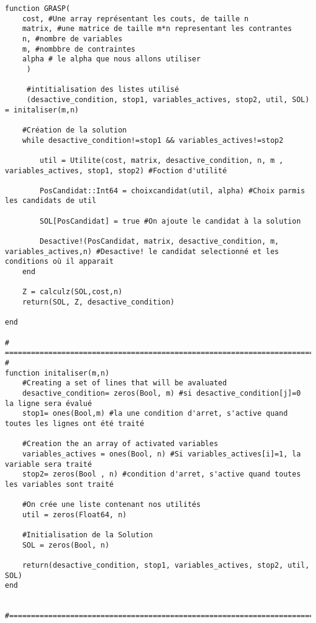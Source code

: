 \documentclass[10pt]{article}
\begin{document}
\lstset{language=julia}

{
\begin{lstlisting}
function GRASP(
    cost, #Une array représentant les couts, de taille n
    matrix, #une matrice de taille m*n representant les contrantes
    n, #nombre de variables
    m, #nombbre de contraintes
    alpha # le alpha que nous allons utiliser
     )

     #intitialisation des listes utilisé
     (desactive_condition, stop1, variables_actives, stop2, util, SOL) = initaliser(m,n)

    #Création de la solution
    while desactive_condition!=stop1 && variables_actives!=stop2

        util = Utilite(cost, matrix, desactive_condition, n, m , variables_actives, stop1, stop2) #Foction d'utilité

        PosCandidat::Int64 = choixcandidat(util, alpha) #Choix parmis les candidats de util

        SOL[PosCandidat] = true #On ajoute le candidat à la solution

        Desactive!(PosCandidat, matrix, desactive_condition, m, variables_actives,n) #Desactive! le candidat selectionné et les conditions où il apparait
    end

    Z = calculz(SOL,cost,n)
    return(SOL, Z, desactive_condition)

end

# =========================================================================== #
function initaliser(m,n)
    #Creating a set of lines that will be avaluated
    desactive_condition= zeros(Bool, m) #si desactive_condition[j]=0 la ligne sera évalué
    stop1= ones(Bool,m) #la une condition d'arret, s'active quand toutes les lignes ont été traité

    #Creation the an array of activated variables
    variables_actives = ones(Bool, n) #Si variables_actives[i]=1, la variable sera traité
    stop2= zeros(Bool , n) #condition d'arret, s'active quand toutes les variables sont traité

    #On crée une liste contenant nos utilités
    util = zeros(Float64, n)

    #Initialisation de la Solution
    SOL = zeros(Bool, n)

    return(desactive_condition, stop1, variables_actives, stop2, util, SOL)
end

 #=================================================================================#


\end{lstlisting}}
\end{document}
